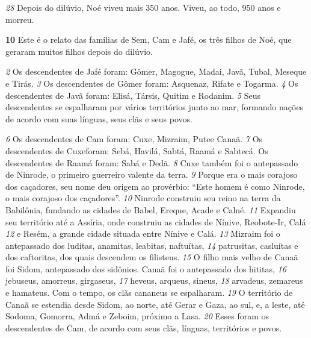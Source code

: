 \bigskip
\textit{\tiny 28}
 Depois do dilúvio, Noé viveu mais 350 anos. Viveu, ao todo, 950 anos e morreu.


\bigskip
\textbf{\large 10}
 Este é o relato das famílias de Sem, Cam e Jafé, os três filhos de Noé, que geraram muitos filhos depois do dilúvio.


\bigskip
\textit{\tiny 2}
 Os descendentes de Jafé foram: Gômer, Magogue, Madai, Javã, Tubal, Meseque e Tirás. 
\textit{\tiny 3}
 Os descendentes de Gômer foram: Asquenaz, Rifate e Togarma. 
\textit{\tiny 4}
 Os descendentes de Javã foram: Elisá, Társis, Quitim e Rodanim. 
\textit{\tiny 5}
 Seus descendentes se espalharam por vários territórios junto ao mar, formando nações de acordo com suas línguas, seus clãs e seus povos.


\bigskip
\textit{\tiny 6}
 Os descendentes de Cam foram: Cuxe, Mizraim, Putee Canaã. 
\textit{\tiny 7}
 Os descendentes de Cuxeforam: Sebá, Havilá, Sabtá, Raamá e Sabtecá. Os descendentes de Raamá foram: Sabá e Dedã. 
\textit{\tiny 8}
 Cuxe também foi o antepassado de Ninrode, o primeiro guerreiro valente da terra. 
\textit{\tiny 9}
 Porque era o mais corajoso dos caçadores, seu nome deu origem ao provérbio: “Este homem é como Ninrode, o mais corajoso dos caçadores”. 
\textit{\tiny 10}
 Ninrode construiu seu reino na terra da Babilônia, fundando as cidades de Babel, Ereque, Acade e Calné. 
\textit{\tiny 11}
 Expandiu seu território até a Assíria, onde construiu as cidades de Nínive, Reobote-Ir, Calá 
\textit{\tiny 12}
 e Resém, a grande cidade situada entre Nínive e Calá. 
\textit{\tiny 13}
 Mizraim foi o antepassado dos luditas, anamitas, leabitas, naftuítas, 
\textit{\tiny 14}
 patrusitas, casluítas e dos caftoritas, dos quais descendem os filisteus. 
\textit{\tiny 15}
 O filho mais velho de Canaã foi Sidom, antepassado dos sidônios. Canaã foi o antepassado dos hititas, 
\textit{\tiny 16}
 jebuseus, amorreus, girgaseus, 
\textit{\tiny 17}
 heveus, arqueus, sineus, 
\textit{\tiny 18}
 arvadeus, zemareus e hamateus. Com o tempo, os clãs cananeus se espalharam. 
\textit{\tiny 19}
 O território de Canaã se estendia desde Sidom, ao norte, até Gerar e Gaza, ao sul, e, a leste, até Sodoma, Gomorra, Admá e Zeboim, próximo a Lasa. 
\textit{\tiny 20}
 Esses foram os descendentes de Cam, de acordo com seus clãs, línguas, territórios e povos.


